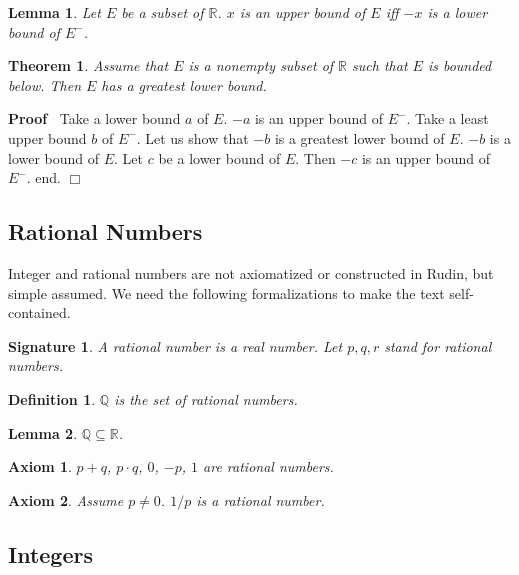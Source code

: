 \documentclass{article}
\newenvironment{forthel}{\begin{leftbar}}{\end{leftbar}}
\newenvironment{proof}{\noindent\textbf{Proof\ }}{\hspace*{\fill}$\Box$\medskip}
\newtheorem{axiom}{Axiom}
\newtheorem{lemma}{Lemma}
\newtheorem{theorem}{Theorem}
\newtheorem{definition}{Definition}
\newtheorem{signature}{Signature}
\newcommand{\RR}{\mathbb{R}}
\newcommand{\QQ}{\mathbb{Q}}
\begin{document}
\begin{forthel}
\begin{lemma} Let $E$ be a subset of $\RR$.
$x$ is an upper bound of $E$ iff $-x$ is a lower bound of $E^-$.
\end{lemma}

\begin{theorem} Assume that $E$ is a nonempty subset of $\RR$ 
such that $E$ is bounded below.
Then $E$ has a greatest lower bound.\end{theorem}
\begin{proof}
Take a lower bound $a$ of $E$.
$-a$ is an upper bound of $E^-$.
Take a least upper bound $b$ of $E^-$.
Let us show that $-b$ is a greatest lower bound of $E$.
$-b$ is a lower bound of $E$. Let $c$ be a lower bound of $E$. 
Then $-c$ is an upper bound of $E^-$.
end. \end{proof}

\end{forthel}

\subsection{Rational Numbers}
Integer and rational numbers are not axiomatized or constructed in Rudin, but simple assumed. We need the following formalizations to make the text self-contained.

\begin{forthel}

\begin{signature} A \emph{rational number} is a real number.
Let $p,q,r$ stand for rational numbers.\end{signature}

\begin{definition} $\QQ$ is the set of rational numbers.
\end{definition}


\begin{lemma} $\QQ \subseteq \RR$.\end{lemma}

\begin{axiom} $p + q$, $p \cdot q$, $0$, $-p$, $1$ are 
rational numbers.\end{axiom}

\begin{axiom} Assume $p \neq 0$. $1/p$ is a rational number.
\end{axiom}

\end{forthel}

\subsection{Integers}
\end{document}
